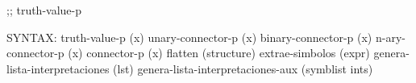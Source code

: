 \begin{aibox}{\function}
;; truth-value-p

SYNTAX: truth-value-p (x)
unary-connector-p (x) 
binary-connector-p (x) 
n-ary-connector-p (x) 
connector-p (x)
flatten (structure)
extrae-simbolos (expr)
genera-lista-interpretaciones (lst) 
genera-lista-interpretaciones-aux (symblist ints)
\end{aibox}

\begin{aibox}{\examples}
\begin{alltt}
\end{alltt}

\end{aibox}

\begin{aibox}{\comments}

\end{aibox}
\begin{aibox}{\answers}

\end{aibox}
\begin{aibox}{\othercomments}

\end{aibox}
\begin{aibox}{\pseudocode}

\end{aibox}
